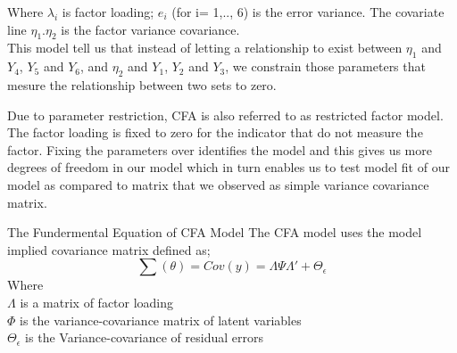 \documentclass{beamer}
\begin{document}
\begin{frame}
Where $\lambda_i$ is factor loading; $e_i$ (for i= 1,.., 6) is the error variance. The covariate line $\eta_1$.$\eta_2$ is the factor variance covariance.\\
This model tell us that instead of letting a relationship to exist between $\eta_1$ and $Y_4$, $Y_5$ and $Y_6$, and $\eta_2$ and $Y_1$, $Y_2$ and $Y_3$, we constrain those parameters that mesure the relationship between two sets to zero.\\
\end{frame}
\begin{frame}
Due to parameter restriction, CFA is also referred to as restricted factor model. The factor loading is fixed to zero for the indicator that do not measure the factor. Fixing the parameters over identifies the model and this gives us more degrees of freedom in our model which in turn enables us to test model fit of our model as compared to matrix that we observed as simple variance covariance matrix.
\end{frame}
\begin{frame}{The Fundermental Equation of CFA Model}
	The CFA model uses the model implied covariance matrix defined as;
	\begin{equation}
		\sum(\theta)= Cov(y)= \Lambda \Psi\Lambda'+\Theta_\epsilon
	\end{equation}
	Where\\
	$\Lambda$ is a matrix of factor loading\\
	$\Phi$ is the variance-covariance matrix of latent variables\\
	$\Theta_\epsilon$ is the Variance-covariance of residual errors\\
\end{frame}
\end{document}
